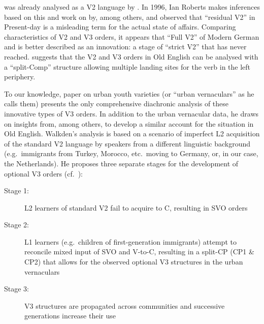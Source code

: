 \documentclass[output=paper]{langsci/langscibook}
\begin{document}
 was already analysed as a V2 language by
\citet{VanKemenade:1987}.  In 1996, Ian Roberts makes inferences based on this
and work on  by, among others, \citet{Kiparsky:1994} and observed
that ``residual V2'' in Present-day  is a misleading term for the
actual state of affairs.  Comparing characteristics of 
V2 and V3 orders, it appears that ``Full
V2'' of Modern German and  is better described as an innovation: a
stage of \enquote{strict V2} that  has never reached.
\textcite{Roberts1996} suggests that the V2 and V3 orders in Old English can be analysed with a ``split-Comp'' structure
allowing multiple landing sites for the verb in the left periphery.

To our knowledge,  paper on  urban youth
varieties (or \enquote{urban vernaculars} as he calls them) presents the only
comprehensive diachronic analysis of these innovative types of V3 orders. In addition to the urban vernacular data, he draws on insights
from, among others, \textcite{Roberts1996} to develop a similar account for the
situation in Old English. Walkden's analysis is based on a scenario of
imperfect L2 acquisition of the standard V2 language by speakers from a different linguistic background (e.g.\
immigrants from Turkey, Morocco, etc.\ moving to Germany, or, in our case, the
Netherlands). He proposes three separate stages for the development of optional
V3\is{V3 word order} orders (cf.\ \citealt{Walkden:2017}):\largerpage

\begin{description}
    \item[Stage 1:] L2 learners of standard  V2 fail to acquire
        \isi{verb movement} to C, resulting in SVO orders

    \item[Stage 2:] L1 learners (e.g.\ children of first-generation
        immigrants) attempt to reconcile mixed input of SVO and V-to-C,
        resulting in a split-CP (CP1 \& CP2) that allows for the observed
        optional V3\is{V3 word order} structures in the urban vernaculars

    \item[Stage 3:] V3 structures are propagated across communities and
        successive generations increase their use
\end{description}
\end{document}
